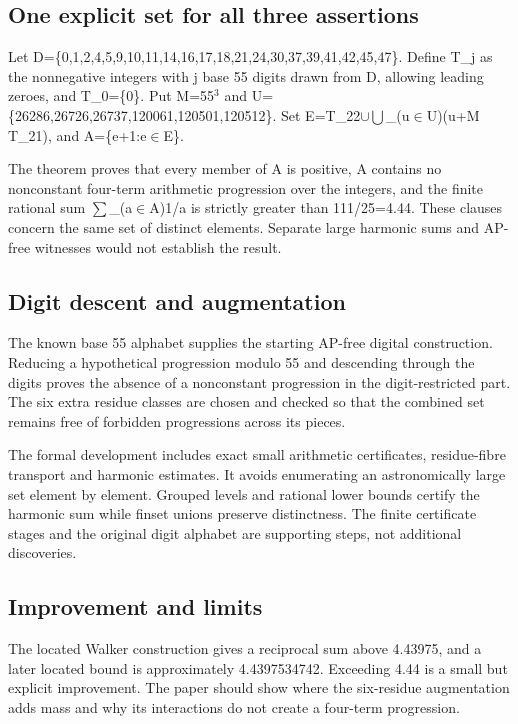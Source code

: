 \documentclass[11pt,a4paper]{article}
\begin{document}
\subsection{One explicit set for all three assertions}
Let D=\{0,1,2,4,5,9,10,11,14,16,17,18,21,24,30,37,39,41,42,45,47\}. Define T\_j as the nonnegative integers with j base 55 digits drawn from D, allowing leading zeroes, and T\_0=\{0\}. Put M=55\ensuremath{^3} and U=\{26286,26726,26737,120061,120501,120512\}. Set E=T\_22\ensuremath{\cup}\ensuremath{\bigcup}\_(u\ensuremath{\in}U)(u+M T\_21), and A=\{e+1:e\ensuremath{\in}E\}.

The theorem proves that every member of A is positive, A contains no nonconstant four-term arithmetic progression over the integers, and the finite rational sum \ensuremath{\sum}\_(a\ensuremath{\in}A)1/a is strictly greater than 111/25=4.44. These clauses concern the same set of distinct elements. Separate large harmonic sums and AP-free witnesses would not establish the result.

\subsection{Digit descent and augmentation}
The known base 55 alphabet supplies the starting AP-free digital construction. Reducing a hypothetical progression modulo 55 and descending through the digits proves the absence of a nonconstant progression in the digit-restricted part. The six extra residue classes are chosen and checked so that the combined set remains free of forbidden progressions across its pieces.

The formal development includes exact small arithmetic certificates, residue-fibre transport and harmonic estimates. It avoids enumerating an astronomically large set element by element. Grouped levels and rational lower bounds certify the harmonic sum while finset unions preserve distinctness. The finite certificate stages and the original digit alphabet are supporting steps, not additional discoveries.

\subsection{Improvement and limits}
The located Walker construction gives a reciprocal sum above 4.43975, and a later located bound is approximately 4.4397534742. Exceeding 4.44 is a small but explicit improvement. The paper should show where the six-residue augmentation adds mass and why its interactions do not create a four-term progression.
\end{document}
